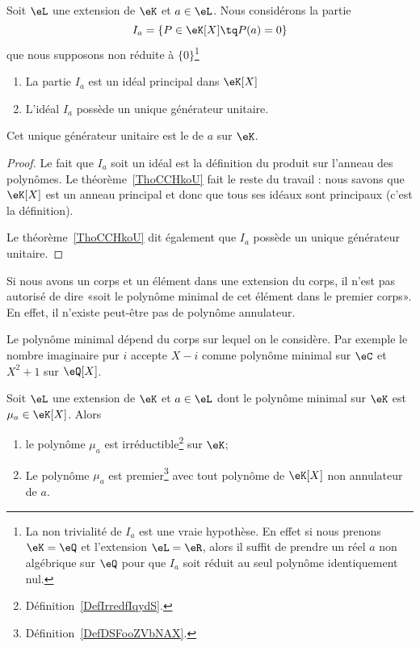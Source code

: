 \begin{lemmaDef}    \label{DefCVMooFGSAgL}
    Soit \( \eL\) une extension de \( \eK\) et \( a\in \eL\). Nous considérons la partie
    \begin{equation}
        I_a=\{ P\in \eK[X]\tq P(a)=0 \}
    \end{equation}
    que nous supposons non réduite à \( \{ 0 \}\)\footnote{La non trivialité de \( I_a\) est une vraie hypothèse. En effet si nous prenons \( \eK=\eQ\) et l'extension \( \eL=\eR\), alors il suffit de prendre un réel \( a\) non algébrique sur \( \eQ\) pour que \( I_a\) soit réduit au seul polynôme identiquement nul.}

    \begin{enumerate}
        \item
            La partie \( I_a\) est un idéal principal dans \( \eK[X]\)
        \item
            L'idéal \( I_a\) possède un unique générateur unitaire.
    \end{enumerate}

    Cet unique générateur unitaire est le  de \( a\) sur \( \eK\).
\end{lemmaDef}

\begin{proof}
    Le fait que \( I_a\) soit un idéal est la définition du produit sur l'anneau des polynômes. Le théorème~\ref{ThoCCHkoU} fait le reste du travail : nous savons que \( \eK[X]\) est un anneau principal et donc que tous ses idéaux sont principaux (c'est la définition).

    Le théorème~\ref{ThoCCHkoU} dit également que \( I_a\) possède un unique générateur unitaire.
\end{proof}

Si nous avons un corps et un élément dans une extension du corps, il n'est pas autorisé de dire «soit le polynôme minimal de cet élément dans le premier corps». En effet, il n'existe peut-être pas de polynôme annulateur.

\begin{example}
    Le polynôme minimal dépend du corps sur lequel on le considère. Par exemple le nombre imaginaire pur \( i\) accepte \( X-i\) comme polynôme minimal sur \( \eC\) et \( X^2+1\) sur \( \eQ[X]\).
\end{example}

\begin{proposition}  \label{PropRARooKavaIT}
    Soit \( \eL\) une extension de \( \eK\) et \( a\in \eL\) dont le polynôme minimal sur \( \eK\) est \( \mu_a\in\eK[X]\). Alors
    \begin{enumerate}
        \item   \label{ItemDOQooYpLvXri}
            le polynôme \( \mu_a\) est irréductible\footnote{Définition~\ref{DefIrredfIqydS}.} sur \( \eK\);
        \item
            Le polynôme \( \mu_a\) est premier\footnote{Définition~\ref{DefDSFooZVbNAX}.} avec tout polynôme de \( \eK[X]\) non annulateur de \( a\).
    \end{enumerate}
\end{proposition}

